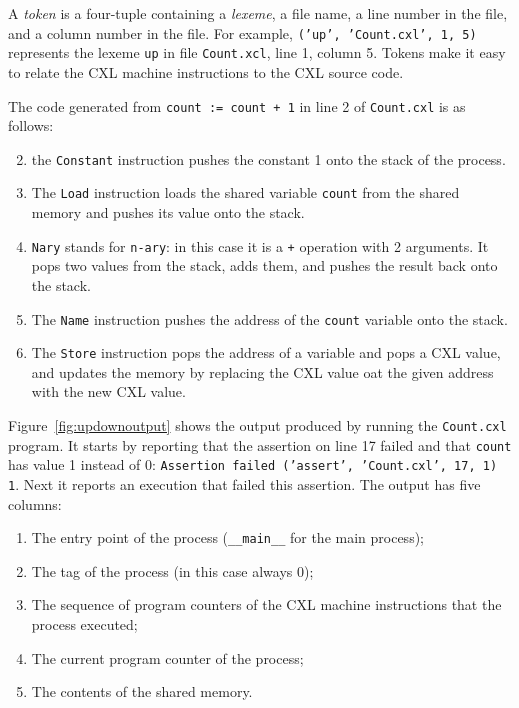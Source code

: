 \documentclass{book}
\begin{document}
A \emph{token} is a four-tuple containing a \emph{lexeme}, a file name, a
line number in the file, and a column number in the file.  For example,
\texttt{(’up’, ’Count.cxl’, 1, 5)} represents the lexeme \texttt{up} in
file \texttt{Count.xcl}, line 1, column 5.  Tokens make it easy to relate
the CXL machine instructions to the CXL source code.

The code generated from \texttt{count := count + 1} in line 2 of
\texttt{Count.cxl} is as follows:

\begin{enumerate} \setcounter{enumi}{1}
\item the \texttt{Constant} instruction pushes the constant 1
onto the stack of the process.
\item The \texttt{Load} instruction loads the shared variable
\texttt{count} from the shared memory and pushes its value onto the
stack.
\item \texttt{Nary} stands for \texttt{n-ary}: in this case it is a \texttt{+}
operation with 2 arguments.  It pops two values from the stack, adds them,
and pushes the result back onto the stack.
\item The \texttt{Name} instruction pushes the address of the \texttt{count}
variable onto the stack.
\item The \texttt{Store} instruction pops the address of a variable and pops
a CXL value, and updates the memory by replacing the CXL value oat the given
address with the new CXL value.
\end{enumerate}

Figure~\ref{fig:updownoutput} shows the output produced by running the
\texttt{Count.cxl} program.
It starts by reporting that the assertion on line 17 failed and that
\texttt{count} has value 1 instead of 0:
\texttt{Assertion failed (’assert’, ’Count.cxl’, 17, 1) 1}.
Next it reports an execution that failed this assertion.  The output has
five columns:
\begin{enumerate}
\item The entry point of the process (\texttt{\_\_main\_\_} for the main process);
\item The tag of the process (in this case always 0);
\item The sequence of program counters of the CXL machine instructions that the process executed;
\item The current program counter of the process;
\item The contents of the shared memory.
\end{enumerate}
\end{document}
